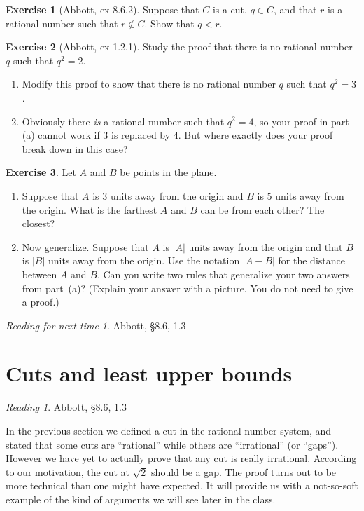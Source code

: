 \documentclass[11pt,oneside]{amsbook}
\theoremstyle{definition}
\newtheorem{exerc}{Exercise}[section]
\theoremstyle{plain}
\theoremstyle{definition}
\theoremstyle{remark}
\newtheorem*{reading}{Reading}
\newtheorem*{readnext}{Reading for next time}
\numberwithin{equation}{section}
\numberwithin{figure}{section}
\begin{document}
\begin{exerc}[Abbott, ex 8.6.2]
  Suppose that $C$ is a cut, $q\in C$, and that $r$ is a rational number such that $r\notin C$. Show that $q<r$.
\end{exerc}

\begin{exerc}[Abbott, ex 1.2.1]
  Study the proof that there is no rational number $q$ such that $q^2=2$.
  \begin{enumerate}
  \item Modify this proof to show that there is no rational number $q$ such that $q^2=3$.
  \item Obviously there \emph{is} a rational number such that $q^2=4$, so your proof in part (a) cannot work if $3$ is replaced by $4$. But where exactly does your proof break down in this case?
  \end{enumerate}
\end{exerc}

\begin{exerc}
  Let $A$ and $B$ be points in the plane.
  \begin{enumerate}
  \item Suppose that $A$ is $3$ units away from the origin and $B$ is $5$ units away from the origin. What is the farthest $A$ and $B$ can be from each other? The closest?
  \item Now generalize. Suppose that $A$ is $|A|$ units away from the origin and that $B$ is $|B|$ units away from the origin.  Use the notation $|A-B|$ for the distance between $A$ and $B$. Can you write two rules that generalize your two answers from part~(a)? (Explain your answer with a picture. You do not need to give a proof.)
  \end{enumerate}
\end{exerc}

\begin{readnext}
  Abbott, \S 8.6, 1.3
\end{readnext}

\newpage
\section{Cuts and least upper bounds}

\begin{reading}
  Abbott, \S 8.6, 1.3
\end{reading}

In the previous section we defined a cut in the rational number system, and stated that some cuts are ``rational'' while others are ``irrational'' (or ``gaps''). However we have yet to actually prove that any cut is really irrational. According to our motivation, the cut at $\sqrt2$ should be a gap. The proof turns out to be more technical than one might have expected. It will provide us with a not-so-soft example of the kind of arguments we will see later in the class.
\end{document}
